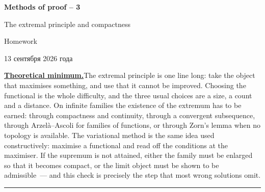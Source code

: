 \documentclass[11pt,a4paper]{article}
\begin{document}
\begin{center}
{\huge\bfseries Methods of proof -- 3\par}\vspace{1.1em}
{\Large The extremal principle and compactness\par}\vspace{1.1em}
{\Large Homework\par}\vspace{1.1em}
{\foreignlanguage{russian}{13 сентября 2026 года}\par}
\end{center}\vspace{0.0pt}

\noindent\textbf{\underline{Theoretical minimum.}}\quad The extremal principle is one line long:
take the object that maximises something, and use that it cannot be improved. Choosing the
functional is the whole difficulty, and the three usual choices are a size, a count and a
distance. On infinite families the existence of the extremum has to be earned: through
compactness and continuity, through a convergent subsequence, through Arzel\`a--Ascoli for
families of functions, or through Zorn's lemma when no topology is available. The variational
method is the same idea used constructively: maximise a functional and read off the conditions at
the maximiser. If the supremum is not attained, either the family must be enlarged so that it
becomes compact, or the limit object must be shown to be admissible~--- and this check is
precisely the step that most wrong solutions omit.

\medskip
\noindent\rule{\textwidth}{0.4pt}
\end{document}
